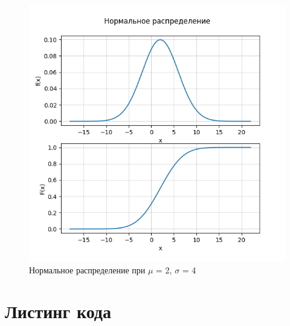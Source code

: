 \begin{figure}[h!]
  \centering
  \includegraphics[scale=0.65]{1/norm2}
  \caption{Нормальное распределение при $\mu$ = 2, $\sigma$ = 4}
\end{figure}
\pagebreak

\section{Листинг кода}


